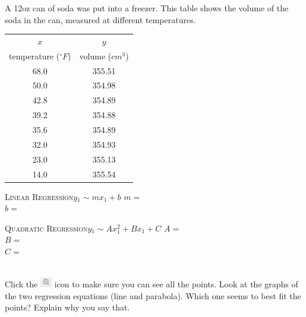 \documentclass[12pt,letterpaper]{memoir}
\begin{document}
{
    A 12oz can of soda was put into a freezer.
    This table shows the volume of the soda in the can,
    measured at different temperatures.\\[0.5em]
    \begin{minipage}{0.35\textwidth}
        \footnotesize
        \begin{tabular}{cc}
            $x$ & $y$ \\ 
            temperature (${}^\circ F$) & volume ($cm^3$) \\
            \midrule 
            68.0 & 355.51 \\
            50.0 & 354.98 \\ 
            42.8 & 354.89 \\ 
            39.2 & 354.88 \\ 
            35.6 & 354.89 \\ 
            32.0 & 354.93 \\ 
            23.0 & 355.13 \\ 
            14.0 & 355.54 \\ 
            \bottomrule
        \end{tabular}
        \end{minipage}
    \begin{minipage}{0.64\textwidth}
        \begin{tcolorbox}[colback=white,width=\textwidth]
            \small
            \scshape{Linear Regression}\hfill$y_1 \sim m x_1 + b$
            \tcblower
            $m =$  \\
            $b =$ 
        \end{tcolorbox}
        \begin{tcolorbox}[colback=white,width=\textwidth]
            \small
            \scshape{Quadratic Regression}\hfill$y_1 \sim A x_1^2 + B x_1 + C$
            \tcblower
            $A =$  \\
            $B =$ \\
            $C =$ 
        \end{tcolorbox}
    \end{minipage}\\[1\onelineskip]
    Click the 
    \includegraphics[width=0.2in]{magnifying-glass-plus.png} 
    icon to make sure you can see all the points.
    Look at the graphs of the two regression equations 
    (line and parabola).
    Which one seems to best fit the points?
    Explain why you say that.
    \vspace{0.7in}
}
\end{document}
